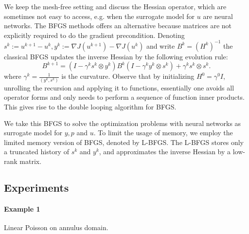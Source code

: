 \documentclass{article}
\begin{document}
We keep the mesh-free setting and discuss the Hessian operator, which are sometimes not easy to access, e.g. when the surrogate model for $u$ are neural networks. The BFGS methods offers an alternative because matrices are not explicitly required to do the gradient precondition. Denoting $s^k:=u^{k+1}-u^k, y^k:=\nabla J(u^{k+1})-\nabla J(u^k)$ and write $B^k=(H^k)^{-1}$ the classical BFGS updates the inverse Hessian by the following evolution rule:
\[
    B^{k+1}=(I-\gamma^k s^k\otimes y^k)B^k(I-\gamma^k y^k\otimes s^k)+\gamma^k s^k\otimes s^k.
\]
where $\gamma^k=\frac{1}{(y^k,s^k)}$ is the curvature. Observe that by initializing $H^0=\gamma^0 I$, unrolling the recursion and applying it to functions, essentially one avoids all operator forms and only needs to perform a sequence of function inner products. This gives rise to the double looping algorithm for BFGS.

We take this BFGS to solve the optimization problems with neural networks as surrogate model for $y,p$ and $u$. To limit the usage of memory, we employ the limited memory version of BFGS, denoted by L-BFGS. The L-BFGS stores only a truncated history of $s^k$ and $y^k$, and approximates the inverse Hessian by a low-rank matrix. 

\subsection{Experiments}
\paragraph*{Example 1} Linear Poisson on annulus domain.
\end{document}
